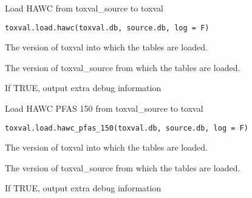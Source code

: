 \documentclass[letterpaper]{book}
\begin{document}
%
\begin{Description}\relax
Load HAWC from toxval\_source to toxval
\end{Description}
%
\begin{Usage}
\begin{verbatim}
toxval.load.hawc(toxval.db, source.db, log = F)
\end{verbatim}
\end{Usage}
%
\begin{Arguments}
\begin{ldescription}
\item[\code{toxval.db}] The version of toxval into which the tables are loaded.

\item[\code{source.db}] The version of toxval\_source from which the tables are loaded.

\item[\code{verbose}] If TRUE, output extra debug information
\end{ldescription}
\end{Arguments}
%
\begin{Description}\relax
Load HAWC PFAS 150 from toxval\_source to toxval
\end{Description}
%
\begin{Usage}
\begin{verbatim}
toxval.load.hawc_pfas_150(toxval.db, source.db, log = F)
\end{verbatim}
\end{Usage}
%
\begin{Arguments}
\begin{ldescription}
\item[\code{toxval.db}] The version of toxval into which the tables are loaded.

\item[\code{source.db}] The version of toxval\_source from which the tables are loaded.

\item[\code{verbose}] If TRUE, output extra debug information
\end{ldescription}
\end{Arguments}
\end{document}
